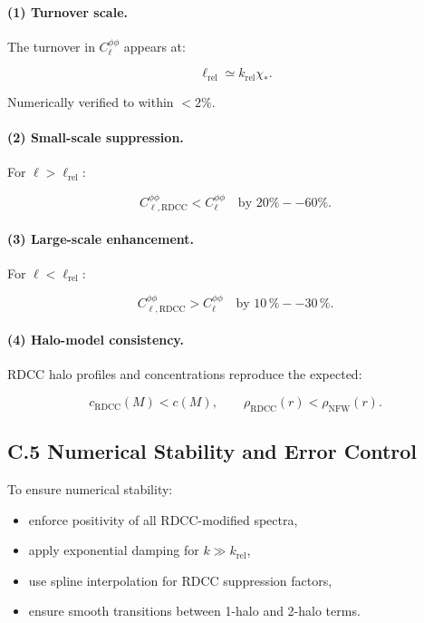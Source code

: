\documentclass[11pt,a4paper]{article}
\begin{document}
\paragraph{(1) Turnover scale.}
The turnover in $C_{\ell}^{\phi\phi}$ appears at:


\[
\ell_{\mathrm{rel}} \simeq k_{\mathrm{rel}}\chi_{*}.
\]


Numerically verified to within $<2\%$.

\paragraph{(2) Small-scale suppression.}
For $\ell > \ell_{\mathrm{rel}}$:


\[
C_{\ell,\mathrm{RDCC}}^{\phi\phi}
<
C_{\ell}^{\phi\phi}
\quad \text{by } 20\%--60\%.
\]



\paragraph{(3) Large-scale enhancement.}
For $\ell < \ell_{\mathrm{rel}}$:


\[
C_{\ell,\mathrm{RDCC}}^{\phi\phi}
>
C_{\ell}^{\phi\phi}
\quad \text{by } 10\,\%--30\,\%.
\]



\paragraph{(4) Halo-model consistency.}
RDCC halo profiles and concentrations reproduce the expected:


\[
c_{\mathrm{RDCC}}(M) < c(M),
\qquad
\rho_{\mathrm{RDCC}}(r) < \rho_{\mathrm{NFW}}(r).
\]



\subsection*{C.5 Numerical Stability and Error Control}

To ensure numerical stability:

\begin{itemize}
\item enforce positivity of all RDCC-modified spectra,
\item apply exponential damping for $k \gg k_{\mathrm{rel}}$,
\item use spline interpolation for RDCC suppression factors,
\item ensure smooth transitions between 1-halo and 2-halo terms.
\end{itemize}
\end{document}
